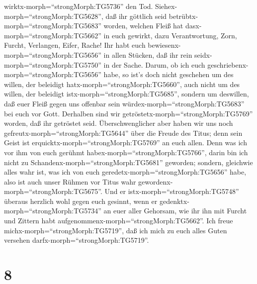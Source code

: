 wirktx-morph=``strongMorph:TG5736'' den Tod. 
Siehex-morph=``strongMorph:TG5628'', daß ihr göttlich seid
betrübtx-morph=``strongMorph:TG5683'' worden, welchen Fleiß hat
dasx-morph=``strongMorph:TG5662'' in euch gewirkt, dazu Verantwortung,
Zorn, Furcht, Verlangen, Eifer, Rache! Ihr habt euch
bewiesenx-morph=``strongMorph:TG5656'' in allen Stücken, daß ihr rein
seidx-morph=``strongMorph:TG5750'' in der Sache.  Darum, ob
ich euch geschriebenx-morph=``strongMorph:TG5656'' habe, so ist's doch
nicht geschehen um des willen, der beleidigt
hatx-morph=``strongMorph:TG5660'', auch nicht um des willen, der
beleidigt istx-morph=``strongMorph:TG5685'', sondern um deswillen, daß
euer Fleiß gegen uns offenbar sein würdex-morph=``strongMorph:TG5683''
bei euch vor Gott.  Derhalben sind wir
getröstetx-morph=``strongMorph:TG5769'' worden, daß ihr getröstet seid.
Überschwenglicher aber haben wir uns noch
gefreutx-morph=``strongMorph:TG5644'' über die Freude des Titus; denn
sein Geist ist erquicktx-morph=``strongMorph:TG5769'' an euch allen.
 Denn was ich vor ihm von euch gerühmt
habex-morph=``strongMorph:TG5766'', darin bin ich nicht zu
Schandenx-morph=``strongMorph:TG5681'' geworden; sondern, gleichwie
alles wahr ist, was ich von euch geredetx-morph=``strongMorph:TG5656''
habe, also ist auch unser Rühmen vor Titus wahr
gewordenx-morph=``strongMorph:TG5675''.  Und er
istx-morph=``strongMorph:TG5748'' überaus herzlich wohl gegen euch
gesinnt, wenn er gedenktx-morph=``strongMorph:TG5734'' an euer aller
Gehorsam, wie ihr ihn mit Furcht und Zittern habt
aufgenommenx-morph=``strongMorph:TG5662''.  Ich freue
michx-morph=``strongMorph:TG5719'', daß ich mich zu euch alles Guten
versehen darfx-morph=``strongMorph:TG5719''.

\hypertarget{section-7}{%
\section{8}\label{section-7}}


